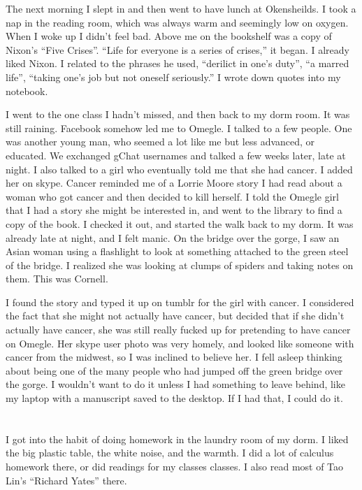 The next morning I slept in and then went to have lunch at Okensheilds.  I took
a nap in the reading room, which was always warm and seemingly low on oxygen.
When I woke up I didn't feel bad.  Above me on the bookshelf was a copy of
Nixon's ``Five Crises''.  ``Life for everyone is a series of crises,'' it began.
I already liked Nixon.  I related to the phrases he used, ``derilict in one's
duty'', ``a marred life'', ``taking one's job but not oneself seriously.''  I
wrote down quotes into my notebook.

I went to the one class I hadn't missed, and then back to my dorm room.  It was
still raining.  Facebook somehow led me to Omegle.  I talked to a few people.
One was another young man, who seemed a lot like me but less advanced, or
educated.  We exchanged gChat usernames and talked a few weeks later, late at
night.  I also talked to a girl who eventually told me that she had cancer.  I
added her on skype.  Cancer reminded me of a Lorrie Moore story I had read about
a woman who got cancer and then decided to kill herself.  I told the Omegle girl
that I had a story she might be interested in, and went to the library to find a
copy of the book.  I checked it out, and started the walk back to my dorm.  It
was already late at night, and I felt manic.  On the bridge over the gorge, I
saw an Asian woman using a flashlight to look at something attached to the green
steel of the bridge.  I realized she was looking at clumps of spiders and taking
notes on them.  This was Cornell.

I found the story and typed it up on tumblr for the girl with cancer.  I
considered the fact that she might not actually have cancer, but decided that if
she didn't actually have cancer, she was still really fucked up for pretending
to have cancer on Omegle.  Her skype user photo was very homely, and looked like
someone with cancer from the midwest, so I was inclined to believe her.  I fell
asleep thinking about being one of the many people who had jumped off the green
bridge over the gorge.  I wouldn't want to do it unless I had something to leave
behind, like my laptop with a manuscript saved to the desktop.  If I had that, I
could do it.

\section{}

I got into the habit of doing homework in the laundry room of my dorm.  I liked
the big plastic table, the white noise, and the warmth.  I did a lot of calculus
homework there, or did readings for my classes classes.  I also read most of Tao
Lin's ``Richard Yates'' there.  


